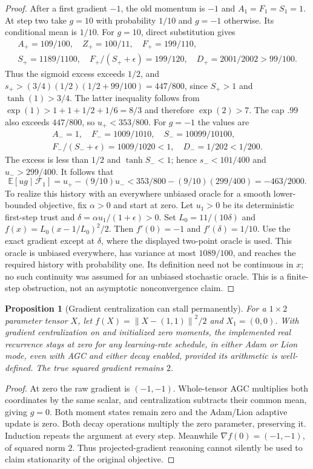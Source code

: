 \documentclass[11pt,a4paper]{article}
\newtheorem{proposition}[theorem]{Proposition}
\theoremstyle{definition}
\theoremstyle{remark}
\newcommand{\E}{\mathbb E}
\newcommand{\norm}[1]{\left\lVert#1\right\rVert}
\begin{document}
\begin{proof}
After a first gradient $-1$, the old momentum is $-1$ and $A_1=F_1=S_1=1$.
At step two take $g=10$ with probability $1/10$ and $g=-1$ otherwise.
Its conditional mean is $1/10$. For $g=10$, direct substitution gives
\[
\begin{gathered}
 A_+=109/100,\quad Z_+=100/11,\quad F_+=199/110,\\
 S_+=1189/1100,\quad F_+/(S_++\epsilon)=199/120,\quad
 D_+=2001/2002>99/100.
\end{gathered}
\]
Thus the sigmoid excess exceeds $1/2$, and
$s_+>(3/4)(1/2)(1/2+99/100)=447/800$, since $S_+>1$ and
$\tanh(1)>3/4$. The latter inequality follows from
$\exp(1)>1+1+1/2+1/6=8/3$ and therefore $\exp(2)>7$.
The cap $.99$ also exceeds $447/800$, so $u_+<353/800$.
For $g=-1$ the values are
\[
\begin{gathered}
 A_-=1,\quad F_-=1009/1010,\quad S_-=10099/10100,\\
 F_-/(S_-+\epsilon)=1009/1020<1,\quad D_-=1/202<1/200.
\end{gathered}
\]
The excess is less than $1/2$ and $\tanh S_-<1$; hence
$s_-<101/400$ and $u_->299/400$. It follows that
\[
 \E[ug\mid\mathcal F_1]=u_+-(9/10)u_-
 <353/800-(9/10)(299/400)=-463/2000.
\]
To realize this history with an everywhere unbiased oracle for a smooth
lower-bounded objective, fix $\alpha>0$ and start at zero. Let $u_1>0$ be its deterministic
first-step trust and $\delta=\alpha u_1/(1+\epsilon)>0$.
Set $L_0=11/(10\delta)$ and $f(x)=L_0(x-1/L_0)^2/2$.
Then $f'(0)=-1$ and $f'(\delta)=1/10$. Use the exact gradient except at
$\delta$, where the displayed two-point oracle is used. This oracle is
unbiased everywhere, has variance at most $1089/100$, and reaches the required
history with probability one. Its definition need not be continuous in $x$;
no such continuity was assumed for an unbiased stochastic oracle.
This is a finite-step obstruction, not an asymptotic nonconvergence claim.
\end{proof}

\begin{proposition}[Gradient centralization can stall permanently]\label{prop:gc}
For a $1\times2$ parameter tensor $X$, let
$f(X)=\norm{X-(1,1)}^2/2$ and $X_1=(0,0)$. With gradient centralization
on and initialized zero moments, the implemented real recurrence stays at
zero for any learning-rate schedule, in either Adam or Lion mode, even with
AGC and either decay enabled, provided its arithmetic is well-defined.
The true squared gradient remains $2$.
\end{proposition}
\begin{proof}
At zero the raw gradient is $(-1,-1)$. Whole-tensor AGC multiplies both
coordinates by the same scalar, and centralization subtracts their common
mean, giving $g=0$. Both moment states remain zero and the Adam/Lion adaptive
update is zero. Both decay operations multiply the zero parameter, preserving
it. Induction repeats the argument at every step. Meanwhile
$\nabla f(0)=(-1,-1)$, of squared norm $2$. Thus projected-gradient reasoning
cannot silently be used to claim stationarity of the original objective.
\end{proof}
\end{document}
